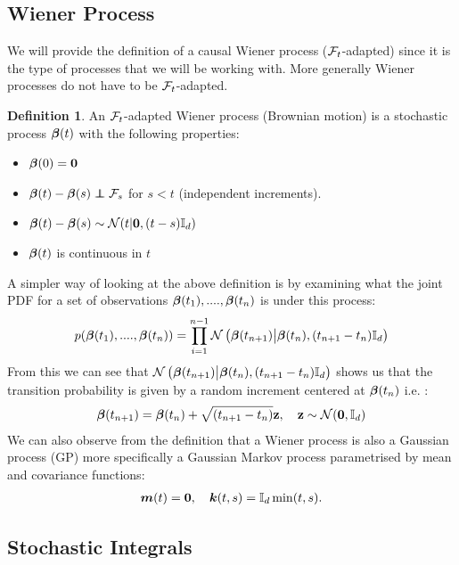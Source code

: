 \documentclass[a4paper,12pt,twoside,openright]{report}
\theoremstyle{definition}
\newtheorem{definition}{Definition}[section]
\begin{document}
\subsection{Wiener Process}

We will provide the definition of a causal Wiener process (${\mathcal{F}}_t$-adapted) since it is the type of processes that we will be working with. More generally Wiener processes do not have to be ${\mathcal{F}}_t$-adapted.
\begin{definition}
    An ${\mathcal{F}}_t$-adapted Wiener process (Brownian motion) is a stochastic process ${\bm{\beta}}(t)$ with the following properties:
    \begin{itemize}
        \item ${\bm{\beta}}(0) = {\bm{0}}$
        \item  $\rvw(t) - \rvw(s) \independent \calF_s$  for $s < t$ (independent increments).
        \item ${\bm{\beta}}(t) - {\bm{\beta}}(s) \sim {\mathcal{N}} (t | {\bm{0}},  (t - s) {\mathbb{I}_d}) $
        \item ${\bm{\beta}}(t)$ is continuous in $t$
    \end{itemize}
\end{definition}
A simpler way of looking at the above definition is by examining what the joint PDF for a set of observations ${\bm{\beta}}(t_1), ...., {\bm{\beta}}(t_n)$  is under this process:
\begin{align*}
    p({\bm{\beta}}(t_1), ...., {\bm{\beta}}(t_n)) = \prod_{i=1}^{n-1} {\mathcal{N}}\left({\bm{\beta}}(t_{n+1})\big| {\bm{\beta}}(t_{n}), (t_{n+1}- t_{n}){\mathbb{I}_d} \right)
\end{align*}
From this we can see that ${\mathcal{N}}\left({\bm{\beta}}(t_{n+1})\big| {\bm{\beta}}(t_{n}), (t_{n+1}- t_{n}){\mathbb{I}_d} \right)$ shows us that the transition probability is given by a random increment  centered at  ${\bm{\beta}}(t_{n})$ i.e. :
\begin{align*}
    {\bm{\beta}}(t_{n+1}) = {\bm{\beta}}(t_{n}) +  \sqrt{(t_{n+1}- t_{n})}{\mathbf{z}} , \quad {\mathbf{z}} \sim {\mathcal{N}}({\bm{0}}, {\mathbb{I}_d}) 
\end{align*}
We can also observe from the definition that a Wiener process is also a Gaussian process (GP) more specifically a Gaussian Markov process parametrised by mean and covariance functions:
\begin{align*}
    {\bm{m}}(t) = {\bm{0}}, \quad {\bm{k}}(t, s) = {\mathbb{I}_d}\min(t, s).
\end{align*}

\subsection{Stochastic Integrals}
\end{document}
